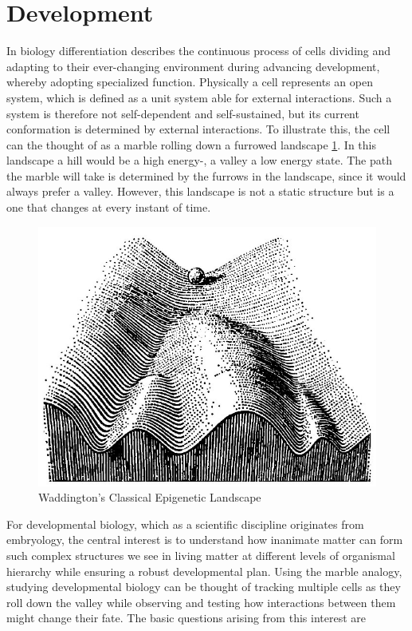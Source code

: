 \documentclass[11pt,singlespacinge,twoside]{reedthesis} %
\begin{document}
\hypertarget{development}{%
\section{Development}\label{development}}

In biology differentiation describes the continuous process of cells dividing and adapting to their ever-changing environment during advancing development, whereby adopting specialized function. Physically a cell represents an open system, which is defined as a unit system able for external interactions. Such a system is therefore not self-dependent and self-sustained, but its current conformation is determined by external interactions. To illustrate this, the cell can the thought of as a marble rolling down a furrowed landscape \ref{fig:wadd}. In this landscape a hill would be a high energy-, a valley a low energy state. The path the marble will take is determined by the furrows in the landscape, since it would always prefer a valley. However, this landscape is not a static structure but is a one that changes at every instant of time.
\begin{figure}

{\centering \includegraphics{figures/intro/waddington} 

}

\caption{Waddington's Classical Epigenetic Landscape}\label{fig:wadd}
\end{figure}
For developmental biology, which as a scientific discipline originates from embryology, the central interest is to understand how inanimate matter can form such complex structures we see in living matter at different levels of organismal hierarchy while ensuring a robust developmental plan. Using the marble analogy, studying developmental biology can be thought of tracking multiple cells as they roll down the valley while observing and testing how interactions between them might change their fate. The basic questions arising from this interest are
\end{document}
